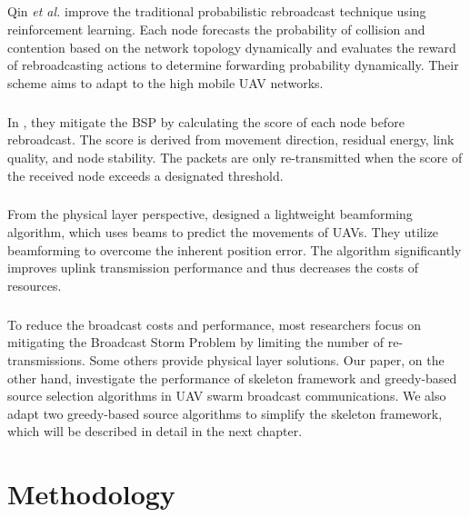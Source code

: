 \documentclass[a4paper,12pt]{report}
\begin{document}
\paragraph{}
Qin {\it et al.}\cite{6} improve the traditional probabilistic rebroadcast technique using reinforcement learning. Each node forecasts the probability of collision and contention based on the network topology dynamically and evaluates the reward of rebroadcasting actions to determine forwarding probability dynamically. Their scheme aims to adapt to the high mobile UAV networks.

\paragraph{}
In \cite{9531630}, they mitigate the BSP by calculating the score of each node before rebroadcast. The score is derived from movement direction, residual energy, link quality, and node stability. The packets are only re-transmitted when the score of the received node exceeds a designated threshold. 

\paragraph{}
From the physical layer perspective, \cite{beamforming} designed a lightweight beamforming algorithm, which uses beams to predict the movements of UAVs. They utilize beamforming to overcome the inherent position error. The algorithm significantly improves uplink transmission performance and thus decreases the costs of resources.

\paragraph{}
To reduce the broadcast costs and performance, most researchers focus on mitigating the Broadcast Storm Problem by limiting the number of re-transmissions. Some others provide physical layer solutions. Our paper, on the other hand, investigate the performance of skeleton framework and greedy-based source selection algorithms in UAV swarm broadcast communications. We also adapt two greedy-based source algorithms to simplify the skeleton framework, which will be described in detail in the next chapter.


\chapter {Methodology}
\end{document}
